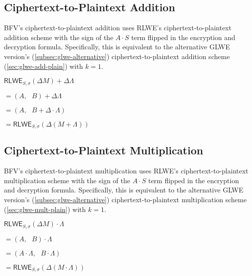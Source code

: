 \subsection{Ciphertext-to-Plaintext Addition}
\label{subsec:bfv-add-plain}

BFV's ciphertext-to-plaintext addition uses RLWE's ciphertext-to-plaintext addition scheme with the sign of the $A\cdot S$ term flipped in the encryption and decryption formula. Specifically, this is equivalent to the alternative GLWE version's (\autoref{subsec:glwe-alternative}) ciphertext-to-plaintext addition scheme (\autoref{sec:glwe-add-plain}) with $k = 1$.  


\begin{tcolorbox}[title={\textbf{\tboxlabel{\ref*{subsec:bfv-add-plain}} BFV Ciphertext-to-Plaintext Addition}}]
$\textsf{RLWE}_{S, \sigma}(\Delta M) + \Delta\Lambda $

$=  (A, \text{ } B) + \Delta\Lambda$

$=  (A, \text{ } B + \Delta\cdot\Lambda)$

$= \textsf{RLWE}_{S, \sigma}(\Delta (M + \Lambda) )$
\end{tcolorbox}



\subsection{Ciphertext-to-Plaintext Multiplication}
\label{subsec:bfv-mult-plain}


BFV's ciphertext-to-plaintext multiplication uses RLWE's ciphertext-to-plaintext multiplication scheme with the sign of the $A\cdot S$ term flipped in the encryption and decryption formula. Specifically, this is equivalent to the alternative GLWE version's (\autoref{subsec:glwe-alternative}) ciphertext-to-plaintext multiplication scheme (\autoref{sec:glwe-mult-plain}) with $k = 1$.   


\begin{tcolorbox}[title={\textbf{\tboxlabel{\ref*{subsec:bfv-mult-plain}} BFV Ciphertext-to-Plaintext Multiplication}}]
$\textsf{RLWE}_{S, \sigma}(\Delta M) \cdot \Lambda$

$= (A, \text{ } B) \cdot \Lambda$

$= (A \cdot \Lambda, \text{ }  B \cdot \Lambda )$

$= \textsf{RLWE}_{S, \sigma}(\Delta (M \cdot \Lambda) )$
\end{tcolorbox}




